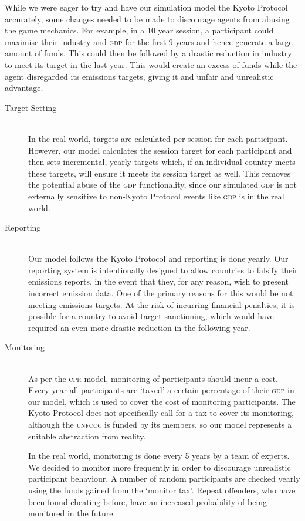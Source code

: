 While we were eager to try and have our simulation model the Kyoto Protocol accurately, some changes needed to be made to discourage agents from abusing the game mechanics. For example, in a 10 year session, a participant could maximise their industry and \textsc{gdp} for the first 9 years and hence generate a large amount of funds. This could then be followed by a drastic reduction in industry to meet its target in the last year. This would create an excess of funds while the agent disregarded its emissions targets, giving it and unfair and unrealistic advantage.

\begin{description}
\item [Target Setting] \hfill \\ 
In the real world, targets are calculated per session for each participant. However, our model calculates the session target for each participant and then sets incremental, yearly targets which, if an individual country meets these targets, will ensure it meets its session target as well. This removes the potential abuse of the \textsc{gdp} functionality, since our simulated \textsc{gdp} is not externally sensitive to non-Kyoto Protocol events like \textsc{gdp} is in the real world.

\item [Reporting] \hfill \\ 
Our model follows the Kyoto Protocol and reporting is done yearly. Our reporting system is intentionally designed to allow countries to falsify their emissions reports, in the event that they, for any reason, wish to present incorrect emission data. One of the primary reasons for this would be not meeting emissions targets. At the risk of incurring financial penalties, it is possible for a country to avoid target sanctioning, which would have required an even more drastic reduction in the following year.

\item [Monitoring] \hfill \\ 
As per the \textsc{cpr} model, monitoring of participants should incur a cost. Every year all participants are `taxed' a certain percentage of their \textsc{gdp} in our model, which is used to cover the cost of monitoring participants. The Kyoto Protocol does not specifically call for a tax to cover its monitoring, although the \textsc{unfccc} is funded by its members, so our model represents a suitable abstraction from reality.

In the real world, monitoring is done every 5 years by a team of experts. We decided to monitor more frequently in order to discourage unrealistic participant behaviour. A number of random participants are checked yearly using the funds gained from the `monitor tax'. Repeat offenders, who have been found cheating before, have an increased probability of being monitored in the future.


\end{description}
